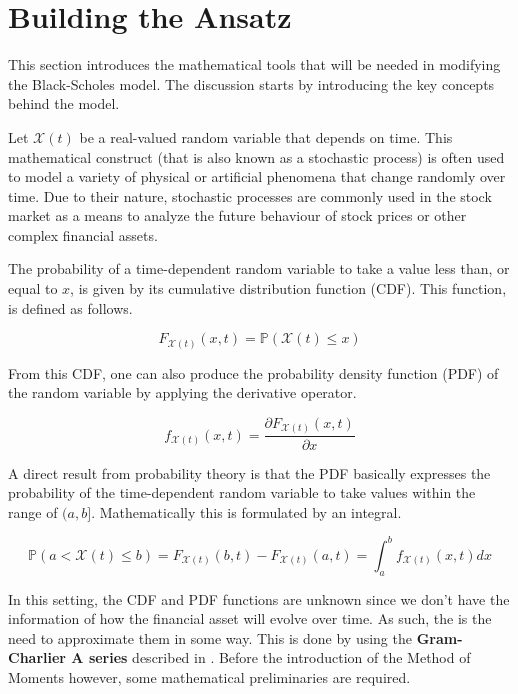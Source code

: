 
\section{Building the Ansatz}
\label{sec: ansatz}

This section introduces the mathematical tools that will be needed in modifying the Black-Scholes model. The discussion starts by introducing the key concepts behind the model.

Let $\mathcal{X}(t)$ be a real-valued random variable that depends on time. This mathematical construct (that is also known as a stochastic process) is often used to model a variety of physical or artificial phenomena that change randomly over time. Due to their nature, stochastic processes are commonly used in the stock market as a means to analyze the future behaviour of stock prices or other complex financial assets. 

The probability of a time-dependent random variable to take a value less than, or equal to \( x \), is given by its cumulative distribution function (CDF). This function, is defined as follows.

\[
F_{\mathcal{X}(t)}(x,t) = \mathbb{P}(\mathcal{X}(t) \leq x)
\]

From this CDF, one can also produce the probability density function (PDF) of the random variable by applying the derivative operator.

\[
f_{\mathcal{X}(t)}(x,t) = \frac{\partial F_{\mathcal{X}(t)}(x,t)}{\partial x}
\]

A direct result from probability theory is that the PDF basically expresses the probability of the time-dependent random variable to take values within the range of $(a,b]$. Mathematically this is formulated by an integral.

\[
\mathbb{P}(a < \mathcal{X}(t) \leq b) = F_{\mathcal{X}(t)} (b,t) - F_{\mathcal{X}(t)}(a,t) = \int_{a}^{b} f_{\mathcal{X}(t)} (x,t) dx
\]

In this setting, the CDF and PDF functions are unknown since we don't have the information of how the financial asset will evolve over time. As such, the is the need to approximate them in some way. This is done by using the \textbf{Gram-Charlier A series} described in \cite{wallace1958asymptotic}. Before the introduction of the Method of Moments however, some mathematical preliminaries are required.

